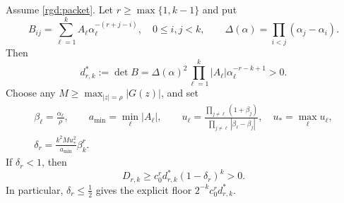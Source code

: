 \begin{proposition}
\label{rgd:pole-margin}
Assume \eqref{rgd:packet}.  Let $r\ge\max\{1,k-1\}$ and put
\[
 B_{ij}=\sum_{\ell=1}^k A_\ell\alpha_\ell^{-(r+j-i)},
 \quad 0\le i,j<k,\qquad
 \Delta(\alpha)=\prod_{i<j}(\alpha_j-\alpha_i).
\]
Then
\begin{equation}
 d^*_{r,k}:=\det B
 =\Delta(\alpha)^2\prod_{\ell=1}^k
       |A_\ell|\alpha_\ell^{-r-k+1}>0.
 \label{rgd:pole-determinant}
\end{equation}
Choose any $M\ge\max_{|z|=\rho}|G(z)|$, and set
\begin{gather}
 \beta_\ell=\frac{\alpha_\ell}{\rho},\qquad
 a_{\min}=\min_\ell|A_\ell|,\qquad
 u_\ell=\frac{\prod_{j\ne\ell}(1+\beta_j)}
                  {\prod_{j\ne\ell}|\beta_\ell-\beta_j|},
 \quad u_*=\max_\ell u_\ell,                              \label{rgd:pole-constants}\\
 \delta_r=\frac{k^2Mu_*^2}{a_{\min}}\beta_k^r.
 \label{rgd:pole-delta}
\end{gather}
If $\delta_r<1$, then
\begin{equation}
 D_{r,k}\ge c_0^r d^*_{r,k}(1-\delta_r)^k>0.
 \label{rgd:pole-floor}
\end{equation}
In particular, $\delta_r\le\tfrac12$ gives the explicit floor
$2^{-k}c_0^r d^*_{r,k}$.
\end{proposition}
